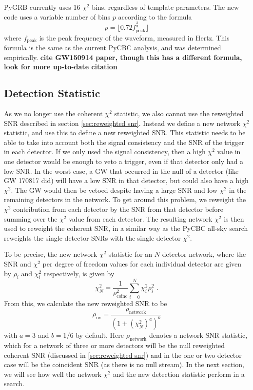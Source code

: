 \documentclass[11pt]{cuthesis}
\newcommand{\fs}{\text{ .}}
\begin{document}
PyGRB currently uses 16 $\chi^2$ bins, regardless of template parameters. The new code uses a variable number of bins $p$ according to the formula
\begin{equation}
p = \lfloor 0.72 f_\text{peak}^\frac{2}{3} \rfloor
\end{equation}
where $f_\text{peak}$ is the peak frequency of the waveform, measured in Hertz. This formula is the same as the current PyCBC analysis, and was determined empirically. \textbf{cite GW150914 paper, though this has a different formula, look for more up-to-date citation}

\subsection{Detection Statistic} \label{sec:new det stat}
As we no longer use the coherent $\chi^2$ statistic, we also cannot use the reweighted SNR described in section \ref{sec:reweighted snr}. Instead we define a new network $\chi^2$ statistic, and use this to define a new reweighted SNR. This statistic needs to be able to take into account both the signal consistency and the SNR of the trigger in each detector. If we only used the signal consistency, then a high $\chi^2$ value in one detector would be enough to veto a trigger, even if that detector only had a low SNR. In the worst case, a GW that occurred in the null of a detector (like GW 170817 did) will have a low SNR in that detector, but could also have a high $\chi^2$. The GW would then be vetoed despite having a large SNR and low $\chi^2$ in the remaining detectors in the network. To get around this problem, we reweight the $\chi^2$ contribution from each detector by the SNR from that detector before summing over the $\chi^2$ value from each detector. The resulting network $\chi^2$ is then used to reweight the coherent SNR, in a similar way as the PyCBC all-sky search reweights the single detector SNRs with the single detector $\chi^2$. 

To be precise, the new network $\chi^2$ statistic for an $N$ detector network, where the SNR and $\chi^2$ per degree of freedom values for each individual detector are given by $\rho_i$ and $\chi^2_i$ respectively, is given by
\begin{equation}
\chi^2_N = \frac{ 1 }{\rho_\text{coinc}^2} \sum_{i=0}^N \chi^2_i \rho^2_i \fs
\end{equation}
From this, we calculate the new reweighted SNR to be
\begin{equation}
\rho_\text{rw} = \frac{\rho_\text{network}}{(1+(\chi^2_N)^a)^b}
\end{equation}
with $a=3$ and $b=1/6$ by default. Here $\rho_\text{network}$ denotes a network SNR statistic, which for a network of three or more detectors will be the null reweighted coherent SNR (discussed in \ref{sec:reweighted snr}) and in the one or two detector case will be the coincident SNR (as there is no null stream). In the next section, we will see how well the network $\chi^2$ and the new detection statistic perform in a search.
\end{document}
